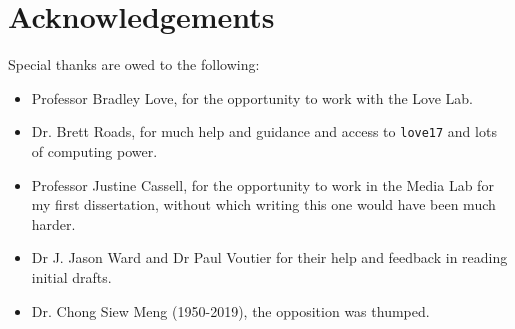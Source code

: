 
\newpage
\section*{Acknowledgements}

Special thanks are owed to the following:

\begin{itemize}
    \item Professor Bradley Love, for the opportunity to work with the Love Lab.
    \item Dr. Brett Roads, for much help and guidance and access to \texttt{love17} and lots of computing power. 
    \item Professor Justine Cassell, for the opportunity to work in the Media Lab for my first dissertation, without which writing this one would have been much harder. 
    \item Dr J. Jason Ward and Dr Paul Voutier for their help and feedback in reading initial drafts.
    \item Dr. Chong Siew Meng (1950-2019), the opposition was thumped.
\end{itemize}